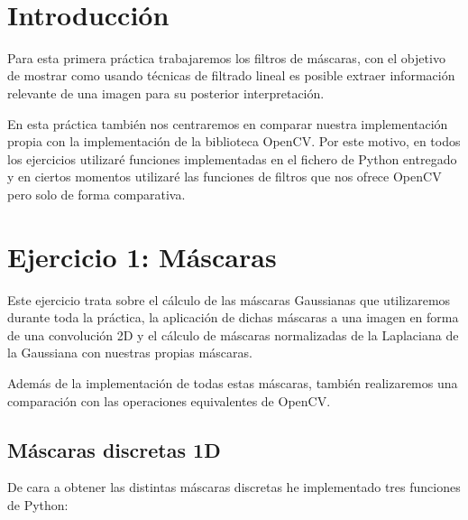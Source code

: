 \documentclass[12pt, spanish]{article}
\makeatletter
\let\thedate\@date
\makeatother
\begin{document}
\begin{titlepage}
    {\large \thedate}\\[0.5cm]
    {\doclicenseThis}

    \vfill

\end{titlepage}


\tableofcontents
\pagebreak



\section*{Introducción}

Para esta primera práctica trabajaremos los filtros de máscaras, con el objetivo de mostrar como usando técnicas de filtrado lineal es posible extraer información relevante de una imagen para su posterior interpretación.

En esta práctica también nos centraremos en comparar nuestra implementación propia con la implementación de la biblioteca OpenCV. Por este motivo, en todos los ejercicios utilizaré funciones implementadas en el fichero de Python entregado y en ciertos momentos utilizaré las funciones de filtros que nos ofrece OpenCV pero solo de forma comparativa.

\section{Ejercicio 1: Máscaras}

Este ejercicio trata sobre el cálculo de las máscaras Gaussianas que utilizaremos durante toda la práctica, la aplicación de dichas máscaras a una imagen en forma de una convolución 2D y el cálculo de máscaras normalizadas de la Laplaciana de la Gaussiana con nuestras propias máscaras.

Además de la implementación de todas estas máscaras, también realizaremos una comparación con las operaciones equivalentes de OpenCV.

\subsection{Máscaras discretas 1D}

De cara a obtener las distintas máscaras discretas he implementado tres funciones de Python:
\end{document}
